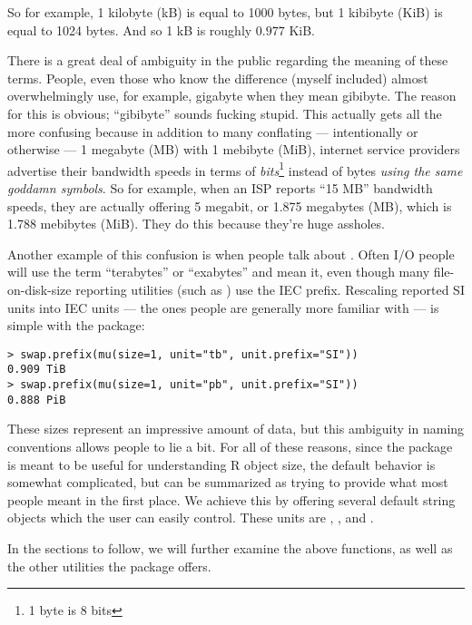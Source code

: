 So for example, 1 kilobyte (kB) is equal to 1000 bytes, but 1 kibibyte (KiB) is equal to 1024 bytes.  And so 1 kB is roughly $0.977$ KiB.

There is a great deal of ambiguity in the public regarding the meaning of these terms.  People, even those who know the difference (myself included) almost overwhelmingly use, for example, gigabyte when they mean gibibyte.  The reason for this is obvious; ``gibibyte'' sounds fucking stupid.  This actually gets all the more confusing because in addition to many conflating --- intentionally or otherwise --- 1 megabyte (MB) with 1 mebibyte (MiB), internet service providers advertise their bandwidth speeds in terms of \emph{bits}\footnote{1 byte is 8 bits} instead of bytes \emph{using the same goddamn symbols}.  So for example, when an ISP reports ``15 MB'' bandwidth speeds, they are actually offering 5 megabit, or  1.875 megabytes (MB), which is 1.788 mebibytes (MiB).  They do this because they're huge assholes.

Another example of this confusion is when people talk about .  Often I/O people will use the term ``terabytes'' or ``exabytes'' and mean it, even though many file-on-disk-size reporting utilities (such as ) use the IEC prefix.  Rescaling reported SI units into IEC units --- the ones people are generally more familiar with --- is simple with the  package:
\begin{lstlisting}[language=rr]
> swap.prefix(mu(size=1, unit="tb", unit.prefix="SI"))
0.909 TiB
> swap.prefix(mu(size=1, unit="pb", unit.prefix="SI"))
0.888 PiB
\end{lstlisting}

These sizes represent an impressive amount of data, but this ambiguity in naming conventions allows people to lie a bit.  For all of these reasons, since the package is meant to be useful for understanding R object size, the default behavior is somewhat complicated, but can be summarized as trying to provide what most people meant in the first place.  We achieve this by offering several default string objects which the user can easily control.  These units are , , and .  

In the sections to follow, we will further examine the above  functions, as well as the other utilities the package offers.


